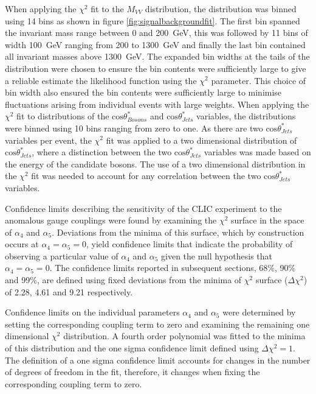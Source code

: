 When applying the $\chi^{2}$ fit to the $M_{VV}$ distribution, the distribution was binned using 14 bins as shown in figure \ref{fig:signalbackgroundfit}.  The first bin spanned the invariant mass range between 0 and 200~GeV, this was followed by 11 bins of width 100~GeV ranging from 200 to 1300~GeV and finally the last bin contained all invariant masses above 1300~GeV.  The expanded bin widths at the tails of the distribution were chosen to ensure the bin contents were sufficiently large to give a reliable estimate the likelihood function using the $\chi^{2}$ parameter.  This choice of bin width also ensured the bin contents were sufficiently large to minimise fluctuations arising from individual events with large weights.  When applying the $\chi^{2}$ fit to distributions of the $\text{cos}\theta^{*}_{Bosons}$ and $\text{cos}\theta^{*}_{Jets}$ variables, the distributions were binned using 10 bins ranging from zero to one.  As there are two $\text{cos}\theta^{*}_{Jets}$ variables per event, the $\chi^{2}$ fit was applied to a two dimensional distribution of $\text{cos}\theta^{*}_{Jets}$, where a distinction between the two $\text{cos}\theta^{*}_{Jets}$ variables was made based on the energy of the candidate bosons.  The use of a two dimensional distribution in the $\chi^{2}$ fit was needed to account for any correlation between the two $\text{cos}\theta^{*}_{Jets}$ variables.  

Confidence limits describing the sensitivity of the CLIC experiment to the anomalous gauge couplings were found by examining the $\chi^{2}$ surface in the space of $\alpha_{4}$ and $\alpha_{5}$.  Deviations from the minima of this surface, which by construction occurs at $\alpha_{4} = \alpha_{5} = 0$, yield confidence limits that indicate the probability of observing a particular value of $\alpha_{4}$ and $\alpha_{5}$ given the null hypothesis that $\alpha_{4} = \alpha_{5} = 0$.  The confidence limits reported in subsequent sections, 68\%, 90\% and 99\%, are defined using fixed deviations from the minima of $\chi^{2}$ surface ($\Delta\chi^{2}$) of 2.28, 4.61 and 9.21 respectively.

Confidence limits on the individual parameters $\alpha_{4}$ and $\alpha_{5}$ were determined by setting the corresponding coupling term to zero and examining the remaining one dimensional $\chi^{2}$ distribution.  A fourth order polynomial was fitted to the minima of this distribution and the one sigma confidence limit defined using $\Delta\chi^{2} = 1$.  The definition of a one sigma confidence limit accounts for changes in the number of degrees of freedom in the fit, therefore, it changes when fixing the corresponding coupling term to zero.  


